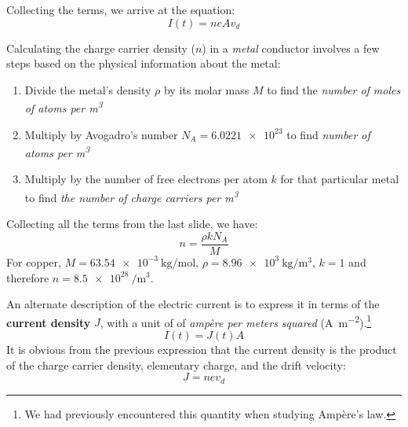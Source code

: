 Collecting the terms, we arrive at the equation:
\begin{equation}
  I(t)=neAv_d
\end{equation}

Calculating the charge carrier density ($n$) in a \emph{metal} conductor
involves a few steps based on the physical information about the metal:
\begin{enumerate}[itemsep=6pt]
\item Divide the metal's density $\rho$ by its molar mass $M$ to find the
  \emph{number of moles of atoms per \si{\metre^3}}
\item Multiply by Avogadro's number $N_A=\num{6.0221e23}$ to find
  \emph{number of atoms per \si{\metre\cubed}}
\item Multiply by the number of free electrons per atom $k$ for that particular
  metal to find \emph{the number of charge carriers per \si{\metre\cubed}}
\end{enumerate}
Collecting all the terms from the last slide, we have:
\begin{equation}
  \boxed{n=\frac{\rho kN_A}M}
\end{equation}
For copper, $M=\SI{63.54e-3}{\kilo\gram\per\mol}$,
$\rho=\SI{8.96e3}{\kilo\gram\per\metre\cubed}$, $k=1$ and therefore
$n=\SI{8.5e28}{\per\metre\cubed}$.

An alternate description of the electric current is to express it in
terms of the \textbf{current density} $J$, with a unit of of \emph{amp\`{e}re
per meters squared} (\si{\ampere\per\meter\squared}).\footnote{We had
previously encountered this quantity when studying Amp\`{e}re's law.}
\begin{equation}
  \boxed{I(t)=J(t)A}
\end{equation}
It is obvious from the previous expression that the current density is the
product of the charge carrier density, elementary charge, and the drift
velocity:
\begin{equation}
  \boxed{J=nev_d}
\end{equation}


